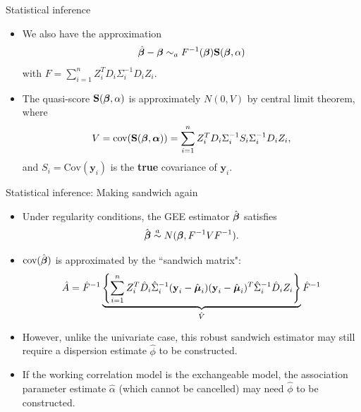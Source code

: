 \documentclass{beamer}
\newcommand{\boldbeta}{{\boldsymbol \beta}}
\newenvironment{wideitemize}%
  {\begin{itemize}%
    \setlength{\parskip}{1em}}%
  {\end{itemize}}
\begin{document}
\begin{frame} {Statistical inference}
\begin{wideitemize}
\item We also have the approximation
\[
\hat{\boldbeta} - \boldbeta \sim_a F^{-1} (\boldbeta)  {\bf S} ({\boldsymbol \beta, \alpha})
\]
with $F=\sum_{i=1}^nZ_i^TD_i\Sigma_i^{-1}D_iZ_i$.

\item The quasi-score ${\bf S} ({\boldsymbol \beta, \alpha})$ is approximately  $N(0, V)$ by central limit theorem, where 
\[
V = \mbox{cov}(\textbf{S}(\mbox{\boldmath $\beta$},\mbox{\boldmath $\alpha$}))=\sum_{i=1}^n Z_i^TD_i\Sigma_i^{-1}
S_i\Sigma_i^{-1}D_iZ_i,
\]
 and $S_i = \text{Cov}(\textbf{y}_i)$ is the {\bf true} covariance of $\textbf{y}_i$.
\end{wideitemize}

\end{frame}

\begin{frame} {Statistical inference: Making sandwich again}
\begin{itemize}
\item
Under regularity conditions, the GEE estimator $\hat{\mbox{\boldmath $\beta$}}$ satisfies
\[
\hat{\mbox{\boldmath $\beta$}}\stackrel{a}{\sim} N(\mbox{\boldmath $\beta$}, F^{-1}VF^{-1}).
\]

\item
$\mbox{cov}(\hat{\mbox{\boldmath $\beta$}})$ is approximated by the ``sandwich matrix":
$$\hat{A}=\hat{F}^{-1} \underbrace{\left\{\sum_{i=1}^n Z_i^T\hat{D}_i\hat{\Sigma}_i^{-1}
(\textbf{y}_i-\hat{\mbox{\boldmath $\mu$}}_i)
(\textbf{y}_i-\hat{\mbox{\boldmath $\mu$}}_i)^T\hat{\Sigma}_i^{-1}\hat{D}_iZ_i\right\}}_{\hat{V}}\hat{F}^{-1}$$


\item However, unlike the univariate case, this robust sandwich estimator may still require a dispersion estimate $\hat{\phi}$ to be constructed.

\item  If the working correlation model  is the exchangeable model, the association parameter estimate $\hat{\alpha}$ (which cannot be cancelled) may need $\hat{\phi}$  to be constructed. 


\end{itemize}
\end{frame}
\end{document}
